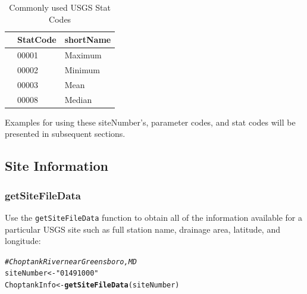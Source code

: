 \documentclass[a4paper,11pt]{article}\usepackage[]{graphicx}\usepackage[]{color}
\makeatletter
\newcommand{\hlstr}[1]{\textcolor[rgb]{0.192,0.494,0.8}{#1}}%
\newcommand{\hlcom}[1]{\textcolor[rgb]{0.678,0.584,0.686}{\textit{#1}}}%
\newcommand{\hlstd}[1]{\textcolor[rgb]{0.345,0.345,0.345}{#1}}%
\newcommand{\hlkwb}[1]{\textcolor[rgb]{0.69,0.353,0.396}{#1}}%
\newcommand{\hlkwd}[1]{\textcolor[rgb]{0.737,0.353,0.396}{\textbf{#1}}}%
\newenvironment{kframe}{%
 \def\at@end@of@kframe{}%
 \ifinner\ifhmode%
  \def\at@end@of@kframe{\end{minipage}}%
  \begin{minipage}{\columnwidth}%
 \fi\fi%
 \def\FrameCommand##1{\hskip\@totalleftmargin \hskip-\fboxsep
 \colorbox{shadecolor}{##1}\hskip-\fboxsep
     \hskip-\linewidth \hskip-\@totalleftmargin \hskip\columnwidth}%
 \MakeFramed {\advance\hsize-\width
   \@totalleftmargin\z@ \linewidth\hsize
   \@setminipage}}%
 {\par\unskip\endMakeFramed%
 \at@end@of@kframe}
\newenvironment{knitrout}{}{} %
\makeatother
\begin{document}
\begin{table}[ht]
\caption{Commonly used USGS Stat Codes} 
\label{tab:stat}
{\footnotesize
\begin{tabular}{rll}
  \hline
 & \multicolumn{1}{c}{\textbf{\textsf{StatCode}}} & \multicolumn{1}{c}{\textbf{\textsf{shortName}}} \\ 
  \hline
 & 00001 & Maximum \\ 
  [5pt] & 00002 & Minimum \\ 
  [5pt] & 00003 & Mean \\ 
  [5pt] & 00008 & Median \\ 
   \hline
\end{tabular}
}
\end{table}


Examples for using these siteNumber's, parameter codes, and stat codes will be presented in subsequent sections.

\FloatBarrier

\subsection{Site Information}
\label{sec:usgsSite}

\subsubsection{getSiteFileData}
\label{sec:usgsSiteFileData}
Use the \texttt{getSiteFileData} function to obtain all of the information available for a particular USGS site such as full station name, drainage area, latitude, and longitude:


\begin{knitrout}
\color{fgcolor}\begin{kframe}
\begin{alltt}
\hlcom{# Choptank River near Greensboro, MD}
\hlstd{siteNumber} \hlkwb{<-} \hlstr{"01491000"}
\hlstd{ChoptankInfo} \hlkwb{<-} \hlkwd{getSiteFileData}\hlstd{(siteNumber)}
\end{alltt}
\end{kframe}
\end{knitrout}
\end{document}
